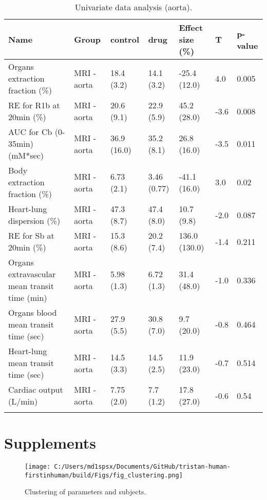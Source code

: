 \documentclass{epflreport}%
\begin{document}
\clearpage%
\begin{longtable}{|p{1.5cm}|p{1.5cm}|p{1.5cm}|p{1.5cm}|p{1.5cm}|p{1.5cm}|p{1.5cm}|}%
\hline%
Name&Group&control&drug&Effect size (\%)&T&p{-}value\\%
\hline%
Organs extraction fraction (\%)&MRI {-} aorta&18.4 (3.2) &14.1 (3.2) &{-}25.4 (12.0) &4.0&0.005\\%
RE for R1b at 20min (\%)&MRI {-} aorta&20.6 (9.1) &22.9 (5.9) &45.2 (28.0) &{-}3.6&0.008\\%
AUC for Cb (0{-}35min) (mM*sec)&MRI {-} aorta&36.9 (16.0) &35.2 (8.1) &26.8 (16.0) &{-}3.5&0.011\\%
Body extraction fraction (\%)&MRI {-} aorta&6.73 (2.1) &3.46 (0.77) &{-}41.1 (16.0) &3.0&0.02\\%
Heart{-}lung dispersion (\%)&MRI {-} aorta&47.3 (8.7) &47.4 (8.0) &10.7 (9.8) &{-}2.0&0.087\\%
RE for Sb at 20min (\%)&MRI {-} aorta&15.3 (8.6) &20.2 (7.4) &136.0 (130.0) &{-}1.4&0.211\\%
Organs extravascular mean transit time (min)&MRI {-} aorta&5.98 (1.3) &6.72 (1.3) &31.4 (48.0) &{-}1.0&0.336\\%
Organs blood mean transit time (sec)&MRI {-} aorta&27.9 (5.5) &30.8 (7.0) &9.7 (20.0) &{-}0.8&0.464\\%
Heart{-}lung mean transit time (sec)&MRI {-} aorta&14.5 (3.3) &14.5 (2.5) &11.9 (23.0) &{-}0.7&0.514\\%
Cardiac output (L/min)&MRI {-} aorta&7.75 (2.0) &7.7 (1.2) &17.8 (27.0) &{-}0.6&0.54\\%
\hline%
\caption{Univariate data analysis (aorta).} \\%
\end{longtable}%
\clearpage%
\chapter{Supplements}%
\clearpage%


\begin{figure}[h!]%
\centering%
\texttt{[image: C:/Users/md1spsx/Documents/GitHub/tristan-human-firstinhuman/build/Figs/fig\_clustering.png]}%
\caption{Clustering of parameters and subjects.}%
\end{figure}

%
\end{document}

